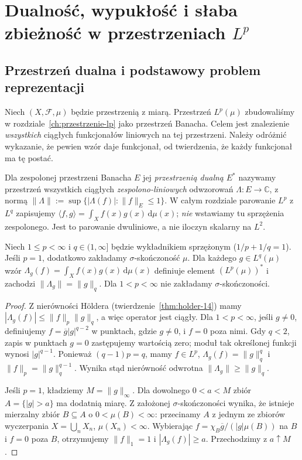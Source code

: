 \chapter[Dualność i geometria przestrzeni $L^p$]{Dualność, wypukłość i słaba zbieżność w przestrzeniach $L^p$}
\label{ch:dualnosc-lp}

\section{Przestrzeń dualna i podstawowy problem reprezentacji}
Niech $(X,\mathcal F,\mu)$ będzie przestrzenią z miarą. Przestrzeń
$L^p(\mu)$ zbudowaliśmy w rozdziale~\ref{ch:przestrzenie-lp} jako
przestrzeń Banacha. Celem jest znalezienie \emph{wszystkich} ciągłych
funkcjonałów liniowych na tej przestrzeni. Należy odróżnić
wykazanie, że pewien wzór daje funkcjonał, od twierdzenia, że
każdy funkcjonał ma tę postać.

\begin{definicja}
\label{def:dual-lp-15}
Dla zespolonej przestrzeni Banacha $E$ jej \emph{przestrzenią dualną}
$E^*$ nazywamy przestrzeń wszystkich ciągłych \emph{zespolono-liniowych}
odwzorowań $\Lambda:E\to\mathbb C$, z normą
$\|\Lambda\|:=\sup\{|\Lambda(f)|:\|f\|_E\le1\}$.
W całym rozdziale parowanie $L^p$ z $L^q$ zapisujemy
$\langle f,g\rangle=\int_X f(x)g(x)\,\mathrm d\mu(x)$;
\emph{nie} wstawiamy tu sprzężenia zespolonego. Jest to parowanie
dwuliniowe, a nie iloczyn skalarny na $L^2$.
\end{definicja}

\begin{lemat}
\label{lem:canonical-lpq-15}
Niech $1\le p<\infty$ i $q\in(1,\infty]$ będzie wykładnikiem
sprzężonym ($1/p+1/q=1$). Jeśli $p=1$, dodatkowo
zakładamy $\sigma$-skończoność $\mu$. Dla każdego $g\in L^q(\mu)$ wzór
$\Lambda_g(f)=\int_X f(x)g(x)\,\mathrm d\mu(x)$ definiuje element
$(L^p(\mu))^*$ i zachodzi $\|\Lambda_g\|=\|g\|_q$.
Dla $1<p<\infty$ nie zakładamy $\sigma$-skończoności.
\end{lemat}
\begin{proof}
Z nierówności Höldera (twierdzenie~\ref{thm:holder-14}) mamy
$|\Lambda_g(f)|\le\|f\|_p\|g\|_q$, a więc operator jest ciągły.
Dla $1<p<\infty$, jeśli $g\ne0$, definiujemy
$f=\overline{g}|g|^{q-2}$ w punktach, gdzie $g\ne0$, i $f=0$
poza nimi. Gdy $q<2$, zapis w punktach $g=0$ zastępujemy wartością zero;
moduł tak określonej funkcji wynosi $|g|^{q-1}$.
Ponieważ $(q-1)p=q$, mamy $f\in L^p$,
$\Lambda_g(f)=\|g\|_q^q$ i $\|f\|_p=\|g\|_q^{q-1}$.
Wynika stąd nierówność odwrotna $\|\Lambda_g\|\ge\|g\|_q$.

Jeśli $p=1$, kładziemy $M=\|g\|_\infty$. Dla dowolnego
$0<a<M$ zbiór $A=\{|g|>a\}$ ma dodatnią miarę.
Z założonej $\sigma$-skończoności wynika, że istnieje
mierzalny zbiór $B\subseteq A$ o $0<\mu(B)<\infty$:
przecinamy $A$ z jednym ze zbiorów wyczerpania
$X=\bigcup_nX_n$, $\mu(X_n)<\infty$.
Wybierając $f=\chi_B\overline g/(|g|\mu(B))$ na $B$
i $f=0$ poza $B$, otrzymujemy $\|f\|_1=1$ i
$|\Lambda_g(f)|\ge a$. Przechodzimy z $a\uparrow M$.
\end{proof}

